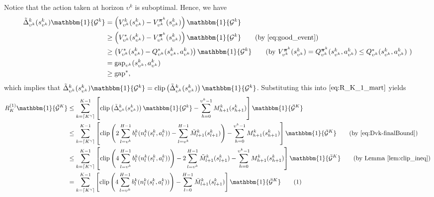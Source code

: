 \documentclass[11pt]{article}
\newcommand{\pii}{\boldsymbol{\pi}}
\newcommand{\Dvk}{\tilde{\Delta}}
\newcommand{\Dvsm}{M}
\newcommand{\Dvkm}{\tilde{M}}
\newcommand{\Dvm}{\bar{M}}
\newcommand{\clip}{\mathrm{clip}}
\newcommand\numberthis{\addtocounter{equation}{1}\tag{\theequation}}
\newcommand{\gap}{\mathrm{gap}}
\newcommand{\gapstar}{\mathrm{gap}^*}
\begin{document}
Notice that the action taken at horizon $\upsilon^k$ is suboptimal. Hence, we have
\begin{align*}
    \Dvk_{\upsilon^k}^k(s_{\upsilon^k}^k)\mathbbm{1}\{\mathcal{G}^k\} &= \left(V_{\upsilon^k}^{k}(s_{\upsilon^k}^k) -V_{\upsilon^k}^{\pii^k}(s_{\upsilon^k}^k) \right) \mathbbm{1}\{\mathcal{G}^k\}\\
    &\geq \left( V_{\upsilon^k}^{*}(s_{\upsilon^k}^k) -V_{\upsilon^k}^{\pii^k}(s_{\upsilon^k}^k)\right) \mathbbm{1}\{\mathcal{G}^k\} \tag{by \eqref{eq:good_event}}\\
    &\geq \left( V_{\upsilon^k}^{*}(s_{\upsilon^k}^k) -Q_{\upsilon^k}^{*}(s_{\upsilon^k}^k,a_{\upsilon^k}^k) \right) \mathbbm{1}\{\mathcal{G}^k\}\tag{by $V_{\upsilon^k}^{\pii^k}(s_{\upsilon^k}^k) = Q_{\upsilon^k}^{\pii^k}(s_{\upsilon^k}^k,a_{\upsilon^k}^k)\leq Q_{\upsilon^k}^{*}(s_{\upsilon^k}^k,a_{\upsilon^k}^k)$  }\\
    &=\gap_{\upsilon^k}(s_{\upsilon^k}^k,a_{\upsilon^k}^k) \\
    &\geq \gapstar,
\end{align*}
which implies that $\Dvk_{\upsilon^k}^k(s_{\upsilon^k}^k) \mathbbm{1}\{\mathcal{G}^k\}= \clip\left(\Dvk_{\upsilon^k}^k(s_{\upsilon^k}^k)\right)\mathbbm{1}\{\mathcal{G}^k\}$. Substituting this into $\eqref{eq:R_K_1_mart}$ yields
\begin{align*}
    R_K^{(1)} \mathbbm{1}\{\bar{\mathcal{G}}^K\}
    &\leq \sum_{k=\lceil K^\gamma\rceil}^{K-1}\left[ \clip\left(\Dvk_{\upsilon^k}^k(s_{\upsilon^k}^k) \right) \mathbbm{1}\{\mathcal{G}^k\} - \sum_{h=0}^{{\upsilon^k}-1}\Dvsm^k_{h+1}(s_{h+1}^k)\right]\mathbbm{1}\{\bar{\mathcal{G}}^K\}\\
    &\leq \sum_{k=\lceil K^\gamma\rceil}^{K-1}\left[ \clip\left(2 \sum_{l=\upsilon^k}^{H-1}  b^k_l(n_l^k(s_l^k, a_l^k))  -  \sum_{l=\upsilon^k}^{H-1} \Dvkm_{l+1}^{k}(s_{l+1}^k) \right) - \sum_{h=0}^{{\upsilon^k}-1}\Dvsm^k_{h+1}(s_{h+1}^k)\right]\mathbbm{1}\{\bar{\mathcal{G}}^K\} \tag{by \eqref{eq:Dvk-finalBound}}\\
     &\leq \sum_{k=\lceil K^\gamma\rceil}^{K-1}\left[ \clip\left(4 \sum_{l=\upsilon^k}^{H-1}  b^k_l(n_l^k(s_l^k, a_l^k))\right)  - 2 \sum_{l=\upsilon^k}^{H-1} \Dvkm_{l+1}^{k}(s_{l+1}^k) - \sum_{h=0}^{{\upsilon^k}-1}\Dvsm^k_{h+1}(s_{h+1}^k)\right]\mathbbm{1}\{\bar{\mathcal{G}}^K\} \tag{by Lemma \ref{lem:clip_ineq}}\\
     &= \sum_{k=\lceil K^\gamma\rceil}^{K-1}\left[ \clip\left(4 \sum_{l=\upsilon^k}^{H-1}  b^k_l(n_l^k(s_l^k, a_l^k))\right)  - \sum_{l=0}^{H-1} \Dvm_{l+1}^{k}(s_{l+1}^k) \right]\mathbbm{1}\{\bar{\mathcal{G}}^K\} \numberthis \label{eq:R_K_1_final_bound}
\end{align*} 
\end{document}
